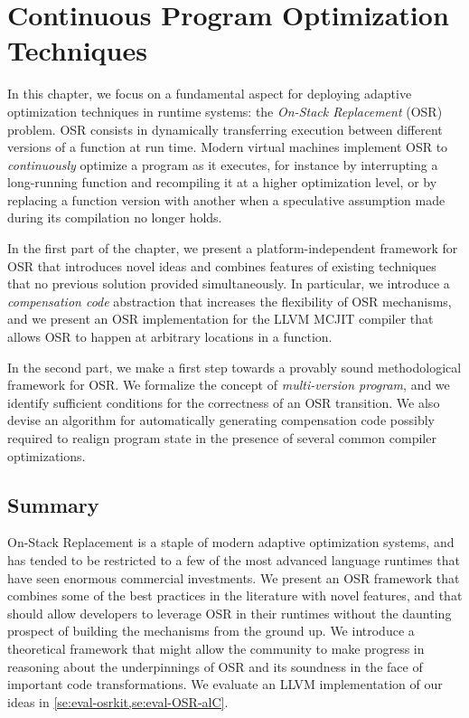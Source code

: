 
\chapter{Continuous Program Optimization Techniques}
\label{ch:continuous}

In this chapter, we focus on a fundamental aspect for deploying adaptive optimization techniques in runtime systems: the {\em On-Stack Replacement} (OSR) problem. OSR consists in dynamically transferring execution between different versions of a function at run time. Modern virtual machines implement OSR to {\em continuously} optimize a program as it executes, for instance by interrupting a long-running function and recompiling it at a higher optimization level, or by replacing a function version with another when a speculative assumption made during its compilation no longer holds.

In the first part of the chapter, we present a platform-independent framework for OSR that introduces novel ideas and combines features of existing techniques that no previous solution provided simultaneously. In particular, we introduce a {\em compensation code} abstraction that increases the flexibility of OSR mechanisms, and we present an OSR implementation for the LLVM MCJIT compiler that allows OSR to happen at arbitrary locations in a function.

In the second part, we make a first step towards a provably sound methodological framework for OSR. We formalize the concept of {\em multi-version program}, and we identify sufficient conditions for the correctness of an OSR transition. We also devise an algorithm for automatically generating compensation code possibly required to realign program state in the presence of several common compiler optimizations.




\section{Summary}
On-Stack Replacement is a staple of modern adaptive optimization systems, and has tended to be restricted to a few of the most advanced language runtimes that have seen enormous commercial investments. We present an OSR framework that combines some of the best practices in the literature with novel features, and that should allow developers to leverage OSR in their runtimes without the daunting prospect of building the mechanisms from the ground up. We introduce a theoretical framework that might allow the community to make progress in reasoning about the underpinnings of OSR and its soundness in the face of important code transformations. We evaluate an LLVM implementation of our ideas in \mysection\ref{se:eval-osrkit,se:eval-OSR-alC}.